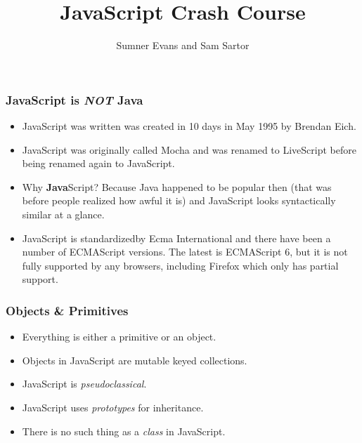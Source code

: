 \documentclass{lug}
\title{JavaScript Crash Course}
\author{Sumner Evans and Sam Sartor}
\begin{document}
\begin{frame}
    \frametitle{JavaScript is \textbf{\textit{NOT}} Java \footnotemark[1]}

    \begin{itemize}[<+->]
        \item JavaScript was written was created in 10 days in May 1995 by Brendan Eich.
        \item JavaScript was originally called Mocha and was renamed to LiveScript before being
            renamed again to JavaScript.
        \item Why \textbf{Java}Script? Because Java happened to be popular then (that was before
            people realized how awful it is) and JavaScript looks syntactically similar at a glance.
        \item JavaScript is standardized\footnotemark[2] by Ecma International and there have been a
            number of ECMAScript versions. The latest is ECMAScript 6, but it is not fully supported
            by any browsers, including Firefox which only has partial support.
    \end{itemize}

\end{frame}

\begin{frame}
    \frametitle{Objects \& Primitives}

    \begin{itemize}[<+->]
        \item Everything is either a primitive or an object.
        \item Objects in JavaScript are mutable keyed collections.
        \item JavaScript is \textit{pseudoclassical}.
        \item JavaScript uses \textit{prototypes} for inheritance.
        \item There is no such thing as a \textit{class} in JavaScript.\footnotemark[1]
    \end{itemize}

\end{frame}
\end{document}
